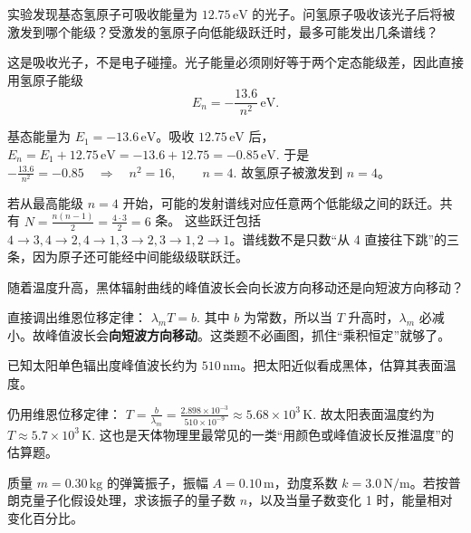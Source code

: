 \documentclass[lang=cn,11pt]{elegantbook}
\begin{document}
\begin{exercise}
实验发现基态氢原子可吸收能量为 \(12.75\,\mathrm{eV}\) 的光子。问氢原子吸收该光子后将被激发到哪个能级？受激发的氢原子向低能级跃迁时，最多可能发出几条谱线？
\end{exercise}

\begin{solution}
这是吸收光子，不是电子碰撞。光子能量必须刚好等于两个定态能级差，因此直接用氢原子能级
\[
E_n=-\frac{13.6}{n^2}\,\mathrm{eV}.
\]

基态能量为 \(E_1=-13.6\,\mathrm{eV}\)。吸收 \(12.75\,\mathrm{eV}\) 后，
 \(E_n=E_1+12.75\,\mathrm{eV} =-13.6+12.75=-0.85\,\mathrm{eV}.\) 
于是
 \(-\frac{13.6}{n^2}=-0.85 \quad\Longrightarrow\quad n^2=16,\qquad n=4.\) 
故氢原子被激发到 \(n=4\)。

若从最高能级 \(n=4\) 开始，可能的发射谱线对应任意两个低能级之间的跃迁。共有
 \(N=\frac{n(n-1)}{2}=\frac{4\cdot 3}{2}=6\) 
条。
这些跃迁包括 \(4\to3,4\to2,4\to1,3\to2,3\to1,2\to1\)。谱线数不是只数“从 4 直接往下跳”的三条，因为原子还可能经中间能级级联跃迁。
\end{solution}

\begin{exercise}[黑体温度升高时峰值波长向哪边移动]
随着温度升高，黑体辐射曲线的峰值波长会向长波方向移动还是向短波方向移动？
\end{exercise}

\begin{solution}
直接调出维恩位移定律：
 \(\lambda_m T=b.\) 
其中 \(b\) 为常数，所以当 \(T\) 升高时，\(\lambda_m\) 必减小。故峰值波长会\textbf{向短波方向移动}。这类题不必画图，抓住“乘积恒定”就够了。
\end{solution}

\begin{exercise}[由太阳峰值波长估算表面温度]
已知太阳单色辐出度峰值波长约为 \(510\,\mathrm{nm}\)。把太阳近似看成黑体，估算其表面温度。
\end{exercise}

\begin{solution}
仍用维恩位移定律：
 \(T=\frac{b}{\lambda_m} =\frac{2.898\times 10^{-3}}{510\times 10^{-9}} \approx 5.68\times 10^3\,\mathrm{K}.\) 
故太阳表面温度约为
 \(\boxed{T\approx 5.7\times 10^3\,\mathrm{K}.}\) 
这也是天体物理里最常见的一类“用颜色或峰值波长反推温度”的估算题。
\end{solution}

\begin{exercise}[宏观弹簧振子的量子数为何巨大]
质量 \(m=0.30\,\mathrm{kg}\) 的弹簧振子，振幅 \(A=0.10\,\mathrm{m}\)，劲度系数 \(k=3.0\,\mathrm{N/m}\)。若按普朗克量子化假设处理，求该振子的量子数 \(n\)，以及当量子数变化 1 时，能量相对变化百分比。
\end{exercise}
\end{document}
